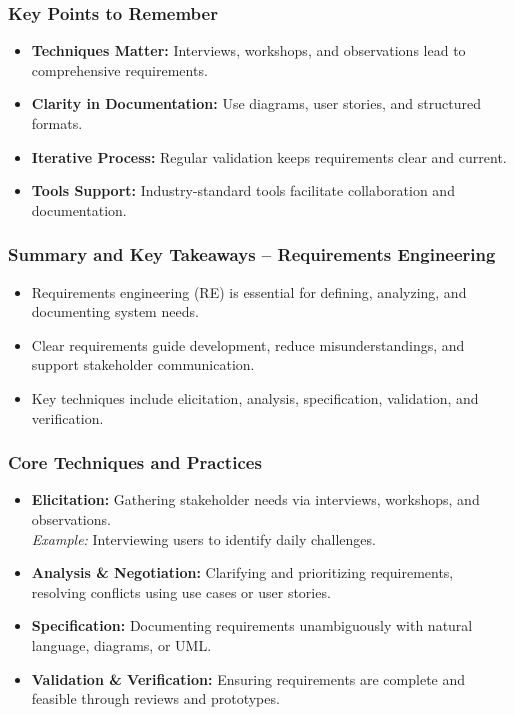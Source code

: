 \documentclass{beamer}
\begin{document}
\begin{frame}[fragile]
  \frametitle{Key Points to Remember}
  \begin{itemize}
    \item \textbf{Techniques Matter:} Interviews, workshops, and observations lead to comprehensive requirements.
    \item \textbf{Clarity in Documentation:} Use diagrams, user stories, and structured formats.
    \item \textbf{Iterative Process:} Regular validation keeps requirements clear and current.
    \item \textbf{Tools Support:} Industry-standard tools facilitate collaboration and documentation.
  \end{itemize}
\end{frame}

\begin{frame}[fragile]
  \frametitle{Summary and Key Takeaways – Requirements Engineering}
  \begin{itemize}
    \item Requirements engineering (RE) is essential for defining, analyzing, and documenting system needs.
    \item Clear requirements guide development, reduce misunderstandings, and support stakeholder communication.
    \item Key techniques include elicitation, analysis, specification, validation, and verification.
  \end{itemize}
\end{frame}

\begin{frame}[fragile]
  \frametitle{Core Techniques and Practices}
  \begin{itemize}
    \item \textbf{Elicitation:} Gathering stakeholder needs via interviews, workshops, and observations. \\
    \quad \textit{Example:} Interviewing users to identify daily challenges.
    \item \textbf{Analysis \& Negotiation:} Clarifying and prioritizing requirements, resolving conflicts using use cases or user stories.
    \item \textbf{Specification:} Documenting requirements unambiguously with natural language, diagrams, or UML.
    \item \textbf{Validation \& Verification:} Ensuring requirements are complete and feasible through reviews and prototypes.
  \end{itemize}
\end{frame}
\end{document}
